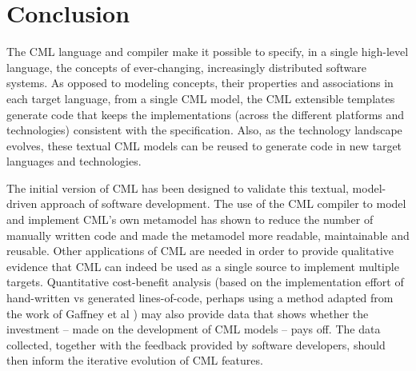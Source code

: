 \section{Conclusion}\label{sec:conclusion}

The CML language and compiler make it possible to specify,
in a single high-level language,
the concepts of ever-changing, increasingly distributed software systems.
As opposed to modeling concepts, their properties and associations in each target language,
from a single CML model,
the CML extensible templates generate code that keeps the implementations
(across the different platforms and technologies)
consistent with the specification.
Also, as the technology landscape evolves,
these textual CML models can be reused to generate code in new target languages and technologies.

The initial version of CML has been designed to validate this textual, model-driven approach of software development.
The use of the CML compiler to model and implement CML's own metamodel
has shown to reduce the number of manually written code and made the metamodel more readable, maintainable and reusable.
Other applications of CML are needed in order to provide qualitative evidence that
CML can indeed be used as a single source to implement multiple targets.
Quantitative cost-benefit analysis
(based on the implementation effort of hand-written vs generated lines-of-code,
perhaps using a method adapted from the work of Gaffney et al \cite{gaffney})
may also provide data
that shows whether the investment -- made on the development of CML models -- pays off.
The data collected, together with the feedback provided by software developers,
should then inform the iterative evolution of CML features.
